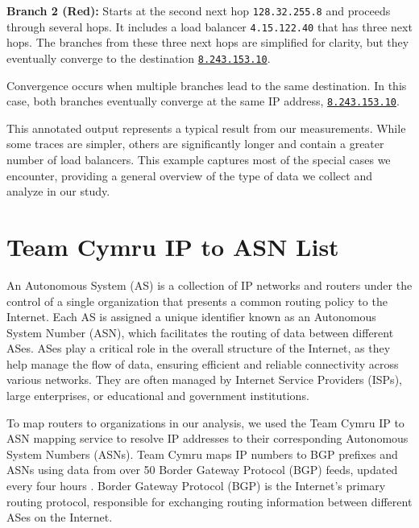 \documentclass[12pt]{cwru_thesis}
\begin{document}
\textbf{Branch 2 (Red):} Starts at the second next hop \texttt{128.32.255.8} and proceeds through several hops. It includes a load balancer \texttt{4.15.122.40} that has three next hops. The branches from these three next hops are simplified for clarity, but they eventually converge to the destination \underline{\texttt{8.243.153.10}}.

Convergence occurs when multiple branches lead to the same destination. In this case, both branches eventually converge at the same IP address, \underline{\texttt{8.243.153.10}}. 

This annotated output represents a typical result from our measurements. While some traces are simpler, others are significantly longer and contain a greater number of load balancers. This example captures most of the special cases we encounter, providing a general overview of the type of data we collect and analyze in our study.
\newpage


\section{Team Cymru IP to ASN List}

An Autonomous System (AS) is a collection of IP networks and routers under the control of a single organization that presents a common routing policy to the Internet. Each AS is assigned a unique identifier known as an Autonomous System Number (ASN), which facilitates the routing of data between different ASes. ASes play a critical role in the overall structure of the Internet, as they help manage the flow of data, ensuring efficient and reliable connectivity across various networks. They are often managed by Internet Service Providers (ISPs), large enterprises, or educational and government institutions.

To map routers to organizations in our analysis, we used the Team Cymru IP to ASN mapping service to resolve IP addresses to their corresponding Autonomous System Numbers (ASNs). Team Cymru maps IP numbers to BGP prefixes and ASNs using data from over 50 Border Gateway Protocol (BGP) feeds, updated every four hours \cite{teamcymru2023ipasn}. Border Gateway Protocol (BGP) is the Internet's primary routing protocol, responsible for exchanging routing information between different ASes on the Internet.
\end{document}
